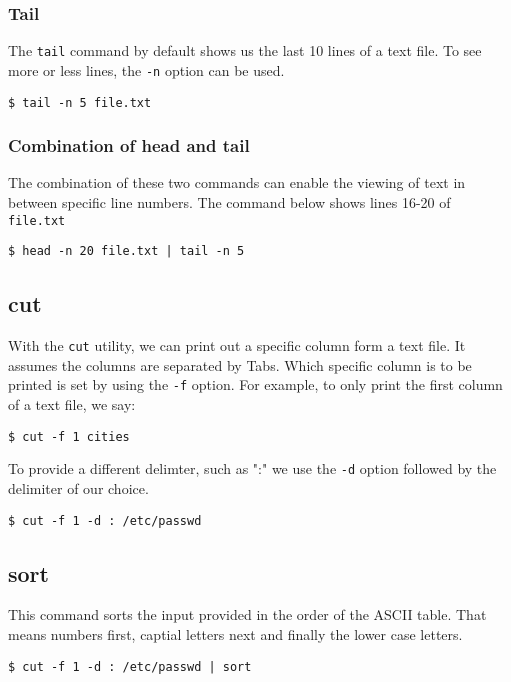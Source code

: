 \subsubsection{Tail}
The \verb|tail| command by default shows us the last 10 lines of a text file. To see more or less lines, the \verb|-n| option can be used.

\begin{verbatim}
$ tail -n 5 file.txt
\end{verbatim}

\subsubsection{Combination of head and tail}
The combination of these two commands can enable the viewing of text in between specific line numbers. The command below shows lines 16-20 of \texttt{file.txt}

\begin{verbatim}
$ head -n 20 file.txt | tail -n 5
\end{verbatim}

\subsection{cut}
With the \verb|cut| utility, we can print out a specific column form a text file. It assumes the columns are separated by Tabs. Which specific column is to be printed is set by using the \verb|-f| option. For example, to only print the first column of a text file, we say:

\begin{verbatim}
$ cut -f 1 cities
\end{verbatim}

\noindent
To provide a different delimter, such as ":" we use the \verb|-d| option followed by the delimiter of our choice. 

\begin{verbatim}
$ cut -f 1 -d : /etc/passwd
\end{verbatim}

\subsection{sort}
This command sorts the input provided in the order of the ASCII table. That means numbers first, captial letters next and finally the lower case letters. 

\begin{verbatim}
$ cut -f 1 -d : /etc/passwd | sort
\end{verbatim}

